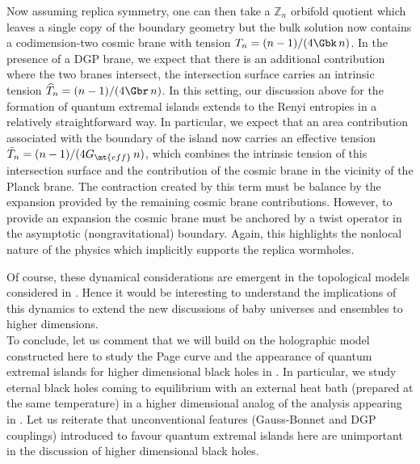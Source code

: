 Now assuming replica symmetry, one can then take a $\mathbb Z_n$ orbifold quotient which leaves a single copy of the boundary geometry but the bulk solution now contains a codimension-two cosmic brane with tension $T_n=(n-1)/(4\Gbk\,n)$. In the presence of a DGP brane, we expect that there is an additional contribution where the two branes intersect, \ie the intersection surface carries an intrinsic tension $\widehat T_n=(n-1)/(4\Gbr\,n)$. In this setting, our discussion above for the formation of quantum extremal islands extends to the Renyi entropies in a relatively straightforward way. In particular, we expect that an area contribution associated with the boundary of the island now carries an effective tension $\tilde T_n=(n-1)/(4G_\mt{eff}\,n)$, which combines the intrinsic tension of this intersection surface and the contribution of the cosmic brane in the vicinity of the Planck brane. The contraction created by this term must be balance by the expansion provided by the remaining cosmic brane contributions. However, to provide an expansion the cosmic brane must be anchored by a twist operator in the asymptotic (nongravitational) boundary. Again, this highlights the nonlocal nature of the physics which implicitly supports the replica wormholes.

Of course, these dynamical considerations are emergent in the topological models considered in \cite{Marolf:2020xie,Penington:2019kki}. Hence it would be interesting to understand the implications of this dynamics to extend the new discussions of baby universes and ensembles to higher dimensions.\\



To conclude, let us comment that we will build on the holographic model constructed here to study the Page curve and the appearance of quantum extremal islands for higher dimensional black holes in \cite{QEI}. In particular, we study eternal black holes coming to equilibrium with an external heat bath (prepared at the same temperature) in a higher dimensional analog of the analysis appearing in \cite{Almheiri:2019yqk}. Let us reiterate that unconventional features (\ie Gauss-Bonnet and DGP couplings) introduced to favour quantum extremal islands here are unimportant in the discussion of higher dimensional black holes.\\






